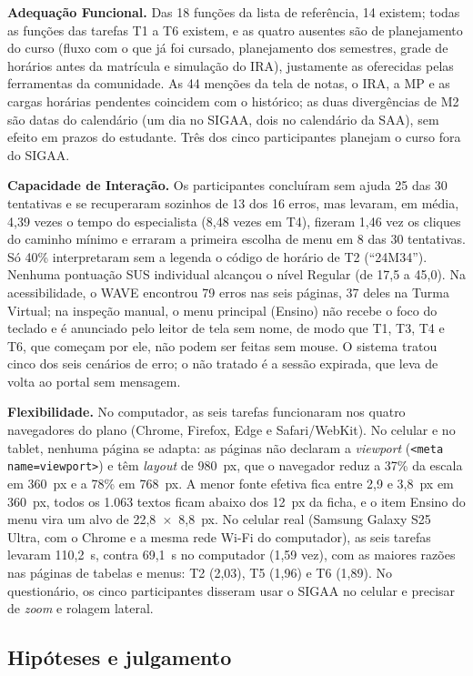 \textbf{Adequação Funcional.} Das 18 funções da lista de referência, 14 existem; todas as funções das tarefas T1 a T6 existem, e as quatro ausentes são de planejamento do curso (fluxo com o que já foi cursado, planejamento dos semestres, grade de horários antes da matrícula e simulação do IRA), justamente as oferecidas pelas ferramentas da comunidade. As 44 menções da tela de notas, o IRA, a MP e as cargas horárias pendentes coincidem com o histórico; as duas divergências de M2 são datas do calendário (um dia no SIGAA, dois no calendário da SAA), sem efeito em prazos do estudante. Três dos cinco participantes planejam o curso fora do SIGAA.

\textbf{Capacidade de Interação.} Os participantes concluíram sem ajuda 25 das 30 tentativas e se recuperaram sozinhos de 13 dos 16 erros, mas levaram, em média, 4,39 vezes o tempo do especialista (8,48 vezes em T4), fizeram 1,46 vez os cliques do caminho mínimo e erraram a primeira escolha de menu em 8 das 30 tentativas. Só 40\% interpretaram sem a legenda o código de horário de T2 (``24M34''). Nenhuma pontuação SUS individual alcançou o nível Regular (de 17,5 a 45,0). Na acessibilidade, o WAVE encontrou 79 erros nas seis páginas, 37 deles na Turma Virtual; na inspeção manual, o menu principal (Ensino) não recebe o foco do teclado e é anunciado pelo leitor de tela sem nome, de modo que T1, T3, T4 e T6, que começam por ele, não podem ser feitas sem mouse. O sistema tratou cinco dos seis cenários de erro; o não tratado é a sessão expirada, que leva de volta ao portal sem mensagem.

\textbf{Flexibilidade.} No computador, as seis tarefas funcionaram nos quatro navegadores do plano (Chrome, Firefox, Edge e Safari/WebKit). No celular e no tablet, nenhuma página se adapta: as páginas não declaram a \textit{viewport} (\texttt{<meta name=viewport>}) e têm \textit{layout} de 980~px, que o navegador reduz a 37\% da escala em 360~px e a 78\% em 768~px. A menor fonte efetiva fica entre 2,9 e 3,8~px em 360~px, todos os 1.063 textos ficam abaixo dos 12~px da ficha, e o item Ensino do menu vira um alvo de 22,8~$\times$~8,8~px. No celular real (Samsung Galaxy S25 Ultra, com o Chrome e a mesma rede Wi-Fi do computador), as seis tarefas levaram 110,2~s, contra 69,1~s no computador (1,59 vez), com as maiores razões nas páginas de tabelas e menus: T2 (2,03), T5 (1,96) e T6 (1,89). No questionário, os cinco participantes disseram usar o SIGAA no celular e precisar de \textit{zoom} e rolagem lateral.

\subsection{Hipóteses e julgamento}

